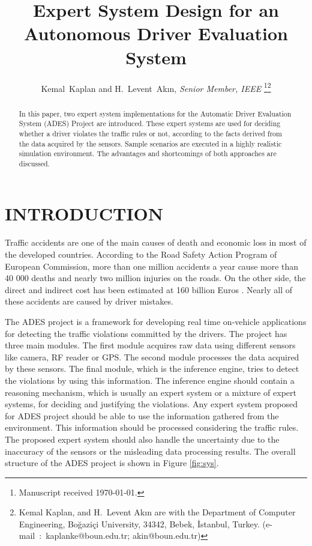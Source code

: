 \documentclass[letterpaper, 10 pt, conference]{ieeeconf}
\title{\LARGE \bf
Expert System Design for an Autonomous Driver Evaluation System
}
\author{}
\author{Kemal~Kaplan and H.~Levent~Ak{\i}n, \textit{Senior Member, IEEE} \thanks{Manuscript received \today.}\thanks{Kemal Kaplan, and H.~Levent Ak{\i}n  are with the Department of Computer Engineering, Bo{\u g}azi{\c c}i University, 34342, Bebek, \.{I}stanbul, Turkey. (e-mail~:~kaplanke@boun.edu.tr; akin@boun.edu.tr)}}
\begin{document}
\maketitle
\thispagestyle{empty}
\pagestyle{empty}


\begin{abstract}
In this paper, two expert system implementations for the Automatic Driver Evaluation System (ADES) Project are introduced. These expert systems are used for deciding whether a driver violates the traffic rules or not, according to the facts derived from the data acquired by the sensors. Sample scenarios are executed in a highly realistic simulation environment. The advantages and shortcomings of both approaches are discussed. 
\end{abstract}

\section{INTRODUCTION}
Traffic accidents are one of the main causes of death and economic loss in most of the developed countries. According to the Road Safety Action Program of European Commission, more than one million accidents a year cause more than 40 000 deaths and nearly two million injuries on the roads. On the other side, the direct and indirect cost has been estimated at 160 billion Euros \cite{Eu01}. Nearly all of these accidents are caused by driver mistakes. 

The ADES project is a framework for developing real time on-vehicle applications for detecting the traffic violations committed by the drivers. The project has three main modules. The first module acquires raw data using different sensors like camera, RF reader or GPS. The second module processes the data acquired by these sensors. The final module, which is the inference engine, tries to detect the violations by using this information. The inference engine should contain a reasoning mechanism, which is usually an expert system or a mixture of expert systems, for deciding and justifying the violations. Any expert system proposed for ADES project should be able to use the information gathered from the environment. This information should be processed considering the traffic rules. The proposed expert system should also handle the uncertainty due to the inaccuracy of the sensors or the misleading data processing results. The overall structure of the ADES project is shown in Figure \ref{fig:sys}.
\end{document}
